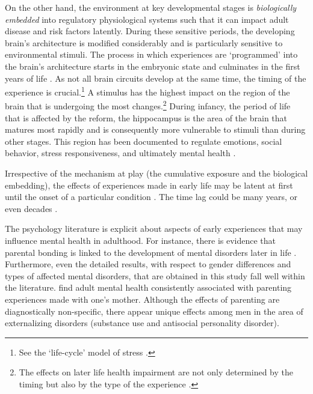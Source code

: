 On the other hand, the environment at key developmental stages is \emph{biologically embedded} into regulatory physiological systems such that it can impact adult disease and risk factors latently. During these sensitive periods, the developing brain's architecture is modified considerably and is particularly sensitive to environmental stimuli. The process in which experiences are `programmed' into the brain's architecture starts in the embryonic state and culminates in the first years of life \citep{raikkonen2012early}. As not all brain circuits develop at the same time, the timing of the experience is crucial.\footnote{See the `life-cycle' model of stress \citep{lupien2009effects}.} A stimulus has the highest impact on the region of the brain that is undergoing the most changes.\footnote{The effects on later life health impairment are not only determined by the timing but also by the type of the experience \citep{raikkonen2012early}.} During infancy, the period of life that is affected by the reform, the hippocampus is the area of the brain that matures most rapidly and is consequently more vulnerable to stimuli than during other stages. This region has been documented to regulate emotions, social behavior, stress responsiveness, and ultimately mental health \citep{center2016best,shonkoff2009neuroscience}. 

Irrespective of the mechanism at play (the cumulative exposure and the biological embedding), the effects of experiences made in early life may be latent at first until the onset of a particular condition \citep{almond2011fetalorigins}. The time lag could be many years, or even decades \citep{shonkoff2009neuroscience}.


The psychology literature is explicit about aspects of early experiences that may influence mental health in adulthood. For instance, there is evidence that parental bonding is linked to the development of mental disorders later in life \citep{canetti1997parental}. Furthermore, even the detailed results, with respect to gender differences and types of affected mental disorders, that are obtained in this study fall well within the literature. \cite{enns_cox_clara_2002} find adult mental health consistently associated with parenting experiences made with one's mother. Although the effects of parenting are diagnostically non-specific, there appear unique effects among men in the area of externalizing disorders (substance use and antisocial personality disorder).






